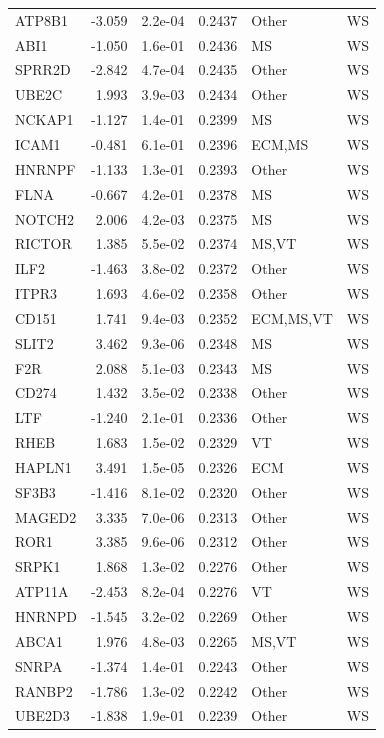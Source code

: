 \begin{table}[ht]
\begin{tabular}{lrlrll}
  ATP8B1 & -3.059 & 2.2e-04 & 0.2437 & Other & WS \\ 
  ABI1 & -1.050 & 1.6e-01 & 0.2436 & MS & WS \\ 
  SPRR2D & -2.842 & 4.7e-04 & 0.2435 & Other & WS \\ 
  UBE2C & 1.993 & 3.9e-03 & 0.2434 & Other & WS \\ 
  NCKAP1 & -1.127 & 1.4e-01 & 0.2399 & MS & WS \\ 
  ICAM1 & -0.481 & 6.1e-01 & 0.2396 & ECM,MS & WS \\ 
  HNRNPF & -1.133 & 1.3e-01 & 0.2393 & Other & WS \\ 
  FLNA & -0.667 & 4.2e-01 & 0.2378 & MS & WS \\ 
  NOTCH2 & 2.006 & 4.2e-03 & 0.2375 & MS & WS \\ 
  RICTOR & 1.385 & 5.5e-02 & 0.2374 & MS,VT & WS \\ 
  ILF2 & -1.463 & 3.8e-02 & 0.2372 & Other & WS \\ 
  ITPR3 & 1.693 & 4.6e-02 & 0.2358 & Other & WS \\ 
  CD151 & 1.741 & 9.4e-03 & 0.2352 & ECM,MS,VT & WS \\ 
  SLIT2 & 3.462 & 9.3e-06 & 0.2348 & MS & WS \\ 
  F2R & 2.088 & 5.1e-03 & 0.2343 & MS & WS \\ 
  CD274 & 1.432 & 3.5e-02 & 0.2338 & Other & WS \\ 
  LTF & -1.240 & 2.1e-01 & 0.2336 & Other & WS \\ 
  RHEB & 1.683 & 1.5e-02 & 0.2329 & VT & WS \\ 
  HAPLN1 & 3.491 & 1.5e-05 & 0.2326 & ECM & WS \\ 
  SF3B3 & -1.416 & 8.1e-02 & 0.2320 & Other & WS \\ 
  MAGED2 & 3.335 & 7.0e-06 & 0.2313 & Other & WS \\ 
  ROR1 & 3.385 & 9.6e-06 & 0.2312 & Other & WS \\ 
  SRPK1 & 1.868 & 1.3e-02 & 0.2276 & Other & WS \\ 
  ATP11A & -2.453 & 8.2e-04 & 0.2276 & VT & WS \\ 
  HNRNPD & -1.545 & 3.2e-02 & 0.2269 & Other & WS \\ 
  ABCA1 & 1.976 & 4.8e-03 & 0.2265 & MS,VT & WS \\ 
  SNRPA & -1.374 & 1.4e-01 & 0.2243 & Other & WS \\ 
  RANBP2 & -1.786 & 1.3e-02 & 0.2242 & Other & WS \\ 
  UBE2D3 & -1.838 & 1.9e-01 & 0.2239 & Other & WS \\ 

\end{tabular}
\end{table}
